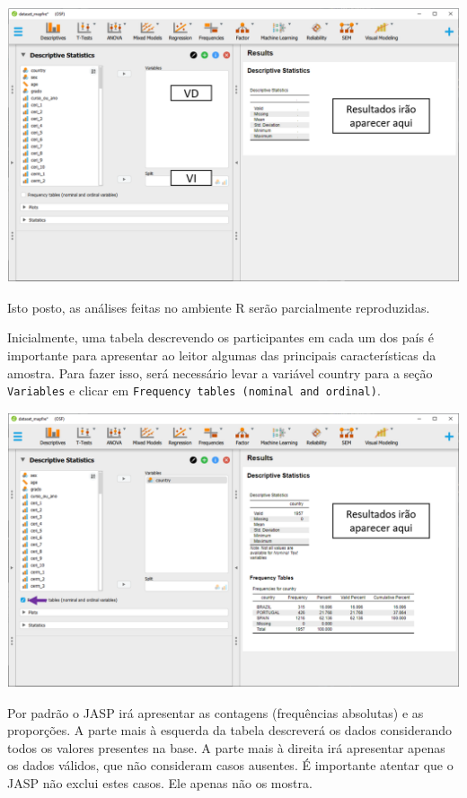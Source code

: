 \documentclass[
]{book}
\begin{document}
\includegraphics{./img/cap_desc_jasp_descritivo2.png}

Isto posto, as análises feitas no ambiente R serão parcialmente reproduzidas.

Inicialmente, uma tabela descrevendo os participantes em cada um dos país é importante para apresentar ao leitor algumas das principais características da amostra. Para fazer isso, será necessário levar a variável country para a seção \texttt{Variables} e clicar em \texttt{Frequency\ tables\ (nominal\ and\ ordinal)}.

\includegraphics{./img/cap_desc_jasp_proporcao.png}

Por padrão o JASP irá apresentar as contagens (frequências absolutas) e as proporções. A parte mais à esquerda da tabela descreverá os dados considerando todos os valores presentes na base. A parte mais à direita irá apresentar apenas os dados válidos, que não consideram casos ausentes. É importante atentar que o JASP não exclui estes casos. Ele apenas não os mostra.
\end{document}
